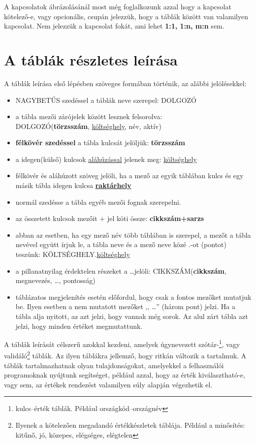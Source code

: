 \documentclass[a4paper,12pt]{report}
\newcommand{\PK}[1]{\textbf{#1}}
\newcommand{\FK}[1]{\underline{#1}}
\newcommand{\TABLA}[1]{\noindent\MakeUppercase{#1}}
\newcommand{\TMEZO}[2]{\MakeUppercase{#1}.{\underline{#2}}}
\begin{document}
A kapcsolatok ábrázolásánál most még foglalkozunk azzal hogy a kapcsolat 
kötelező-e, vagy opcionális, csupán jelezzük, hogy a táblák között van 
valamilyen kapcsolat. Nem jelezzük a kapcsolat fokát, ami lehet \textbf{1:1, 
1:n, m:n} sem.

\section{A táblák részletes leírása}
A táblák leírása első lépésben szöveges formában történik, az alábbi 
jelölésekkel:
\begin{itemize}
 \item \TABLA{nagybetűs} szedéssel a táblák neve szerepel: \TABLA{dolgozó}
 \item a tábla mezői zárójelek között lesznek felsorolva:\\ 
 \TABLA{DOLGOZÓ}(\PK{törzsszám}, \FK{költséghely}, név, aktív)
 \item \PK{félkövér szedéssel} a tábla kulcsát jelöljük: \PK{törzsszám}
 \item a idegen(külső) kulcsok \FK{aláhúzással} jelenek meg: 
 \FK{költséghely}
 \item félkövér és aláhúzott szöveg jelöli, ha a mező az egyik táblában kulcs 
és egy másik tábla idegen kulcsa \PK{\FK{raktárhely}} 
\item normál szedésse a tábla egyéb mezői fognak szerepelni.
\item az összetett kulcsok mezőit $+$ jel köti össze: \PK{cikkszám+sarzs}
\item abban az esetben, ha egy mező név több táblában is szerepel, a mezőt 
a tábla nevével együtt írjuk le, a tábla neve és a mező neve közé .-ot 
(pontot) teszünk: \TMEZO{KÖLTSÉGHELY}{költséghely}
\item a pillanatnyilag érdektelen részeket a \dots jelöli:
\TABLA{cikkszám}(\PK{cikkszám}, megnevezés, \dots, pontosság)
\item táblázatos megjelenítés esetén előfordul, hogy csak a fontos mezőket 
mutatjuk be. Ilyen esetben a nem mutatott mezőket ,, \dots  '' (három pont) 
jelzi. Ha a tábla alja nyitott, az azt jelzi, hogy vannak még sorok. Az 
alul zárt tábla azt jelzi, hogy minden értéket megmutattunk.
\end{itemize}

A táblák leírását célszerű azokkal kezdeni, amelyek úgynevezett 
szótár-\footnote{kulcs--érték táblák. Például országkód--országnév}, vagy
validáló\footnote{Ilyenek a kötelezően megadandó értékkészletek táblája. 
Például a minősítés: kitűnő, jó, közepes, elégséges, elégtelen} táblák.
Az ilyen táblákra jellemző, hogy ritkán változik a tartalmuk. A táblák 
tartalmazhatnak olyan tulajdonságokat, amelyekkel a felhasználói
programoknak nyújtunk segítséget, például azzal, hogy az érték
kiválasztható-e, vagy sem, az értékek rendezést valamilyen súly alapján 
végezhetik el.
\end{document}
